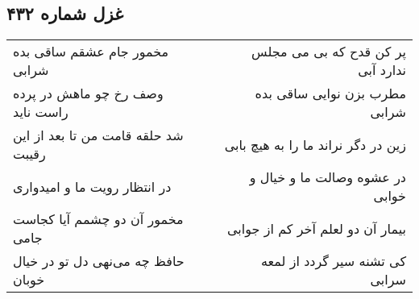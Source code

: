 \begin{center}
\section*{غزل شماره ۴۳۲}
\label{sec:sh432}
\begin{longtable}{l p{0.5cm} r}
مخمور جام عشقم ساقی بده شرابی
&&
پر کن قدح که بی می مجلس ندارد آبی
\\
وصف رخ چو ماهش در پرده راست ناید
&&
مطرب بزن نوایی ساقی بده شرابی
\\
شد حلقه قامت من تا بعد از این رقیبت
&&
زین در دگر نراند ما را به هیچ بابی
\\
در انتظار رویت ما و امیدواری
&&
در عشوه وصالت ما و خیال و خوابی
\\
مخمور آن دو چشمم آیا کجاست جامی
&&
بیمار آن دو لعلم آخر کم از جوابی
\\
حافظ چه می‌نهی دل تو در خیال خوبان
&&
کی تشنه سیر گردد از لمعه سرابی
\\
\end{longtable}
\end{center}
